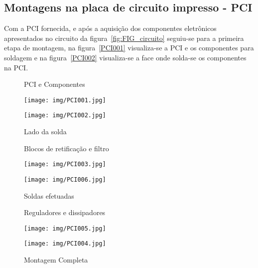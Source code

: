 \documentclass[
	article,			%
	11pt,				%
	oneside,			%
	a4paper,			%
	english,			%
	brazil,				%
	sumario=tradicional
	]{abntex2}
\begin{document}
\subsection{Montagens na placa de circuito impresso - PCI}

Com a PCI fornecida, e após a aquisição dos componentes eletrônicos apresentados no circuito da figura~\ref{fig:FIG_circuito} seguiu-se para a primeira etapa de montagem, na figura~\ref{PCI001} visualiza-se a PCI e os componentes para soldagem e na figura~\ref{PCI002} visualiza-se a face onde solda-se os componentes na PCI.
\begin{figure}[htb!]
   \centering
   \begin{minipage}{0.4\textwidth}
   		\centering
   		\caption{PCI e Componentes} \label{PCI001}
   		\texttt{[image: img/PCI001.jpg]}
   \end{minipage}
   \hspace{1.5cm}
   \begin{minipage}{0.4\textwidth}
   		\centering
   		\caption{Lado da solda} \label{PCI002}
   		\texttt{[image: img/PCI002.jpg]} 
   \end{minipage}
   \label{fig:FIG_PCI1}
\end{figure}
\begin{figure}[htb!]
   \centering
   \begin{minipage}{0.4\textwidth}
   		\centering
   		\caption{Blocos de retificação e filtro} \label{PCI003}
   		\texttt{[image: img/PCI003.jpg]}
   \end{minipage}
   \hspace{1.5cm}
   \begin{minipage}{0.4\textwidth}
   		\centering
   		\caption{Soldas efetuadas} \label{PCI006}
   		\texttt{[image: img/PCI006.jpg]} 
   \end{minipage}
   \label{fig:FIG_PCI2}
\end{figure}
\begin{figure}[htb!]
   \centering
   \begin{minipage}{0.4\textwidth}
   		\centering
   		\caption{Reguladores e dissipadores} \label{PCI005}
   		\texttt{[image: img/PCI005.jpg]}
   \end{minipage}
   \hspace{1.5cm}
   \begin{minipage}{0.4\textwidth}
   		\centering
   		\caption{Montagem Completa} \label{PCI004}
   		\texttt{[image: img/PCI004.jpg]} 
   \end{minipage}
   \label{fig:FIG_DISSIPADORES}
\end{figure}
\end{document}
